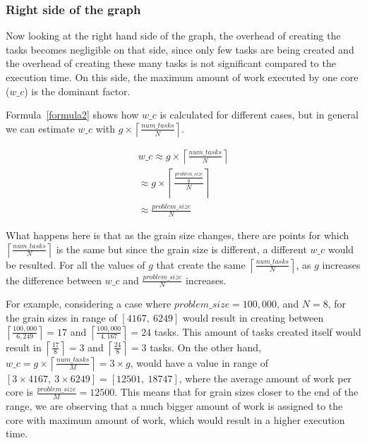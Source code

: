 \subsubsection{Right side of the graph}
Now looking at the right hand side of the graph, the overhead of creating the tasks becomes negligible on that side, since only few tasks are being created and the overhead of creating these many tasks is not significant compared to the execution time. On this side, the maximum amount of work executed by one core ($w\_c$) is the dominant factor.

Formula~\ref{formula2} shows how $w\_c$ is calculated for different cases, but in general we can estimate $w\_c$ with $g\times\left \lceil{\frac{num\_{tasks}}{N}}\right \rceil$. 

\begin{equation}\label{formula6}
\begin{aligned}
w\_c\approx{g\times\left \lceil{\frac{num\_{tasks}}{N}}\right \rceil}\\
\approx{g\times\left \lceil{\frac{\frac{problem\_{size}}{g}}{N}}\right \rceil}\\
\approx{\frac{problem\_{size}}{N}}
\end{aligned}
\end{equation}

What happens here is that as the grain size changes, there are points for which $\left \lceil{\frac{num\_{tasks}}{N}}\right \rceil$ is the same but since the grain size is different, a different $w\_c$ would be resulted. 
For all the values of $g$ that create the same $\left \lceil{\frac{num\_{tasks}}{N}}\right \rceil$, as $g$ increases the difference between $w\_c$ and $\frac{problem\_{size}}{N}$ increases. 

For example, considering a case where $problem\_{size}=100,000$, and $N=8$, for the grain sizes in range of $[4167,\:6249]$ would result in creating between $\left \lceil{\frac{100,000}{6,249}}\right \rceil=17$ and  $\left \lceil{\frac{100,000}{4,167}}\right \rceil=24$ tasks. This amount of tasks created itself would result in $\left \lceil{\frac{17}{8}}\right \rceil=3$ and  $\left \lceil{\frac{24}{8}}\right \rceil=3$ tasks.
On the other hand, $w\_c=g\times{\left \lceil{\frac{num\_{tasks}}{M}}\right \rceil}=3\times{g}$, would have a value in range of $[3\times4167,\:3\times6249]=[12501,\: 18747]$, where the average amount of work per core is $\frac{problem\_{size}}{M}=12500$. This means that for grain sizes closer to the end of the range, we are observing that a much bigger amount of work is assigned to the core with maximum amount of work, which would result in a higher execution time. 


